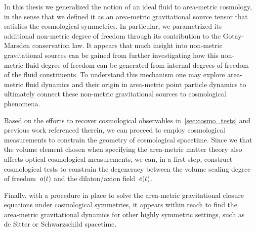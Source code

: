 In this thesis we generalized the notion of an ideal fluid to area-metric cosmology, in the sense that we defined it as an area-metric gravitational source tensor that satisfies the cosmological symmetries. In particular, we parametrized its additional non-metric degree of freedom through its contribution to the Gotay-Marsden conservation law. It appears that much insight into non-metric gravitational sources can be gained from further investigating how this non-metric fluid degree of freedom can be generated from internal degrees of freedom of the fluid constituents. To understand this mechanism one may explore area-metric fluid dynamics and their origin in area-metric point particle dynamics to ultimately connect these non-metric gravitational sources to cosmological phenomena.

Based on the efforts to recover cosmological observables in~\autoref{sec:cosmo_tests} and previous work referenced therein, we can proceed to employ cosmological measurements to constrain the geometry of cosmological spacetime. Since we that the volume element chosen when specifying the area-metric matter theory also affects optical cosmological measurements, we can, in a first step, construct cosmological tests to constrain the degeneracy between the volume scaling degree of freedom~$a(t)$ and the dilaton/axion field~$c(t)$.

Finally, with a procedure in place to solve the area-metric gravitational closure equations under cosmological symmetries, it appears within reach to find the area-metric gravitational dynamics for other highly symmetric  settings, such as de Sitter or Schwarzschild spacetime.



